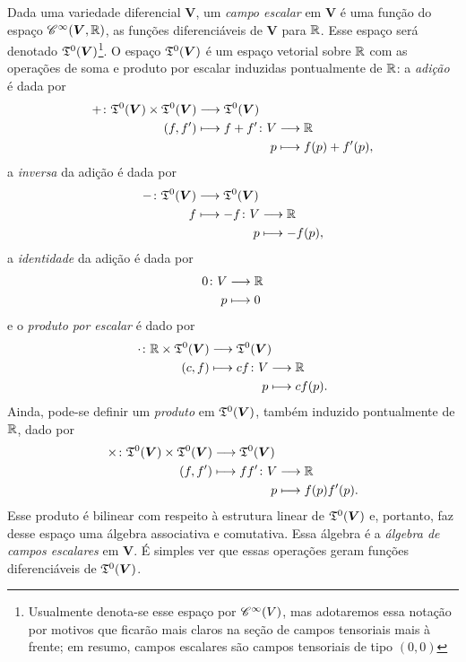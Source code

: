 Dada uma variedade diferencial $\bm V$, um \emph{campo escalar} em $\bm V$ é uma função do espaço $\mathscr{C}^\infty(\bm V,\mathbb{R})$, as funções diferenciáveis de $\bm V$ para $\mathbb{R}$. Esse espaço será denotado $\mathfrak{T}^0(\bm V)$\footnote{Usualmente denota-se esse espaço por $\mathscr{C}^\infty(V)$, mas adotaremos essa notação por motivos que ficarão mais claros na seção de campos tensoriais mais à frente; em resumo, campos escalares são campos tensoriais de tipo $(0,0)$}. O espaço $\mathfrak{T}^0(\bm V)$ é um espaço vetorial sobre $\mathbb{R}$ com as operações de soma e produto por escalar induzidas pontualmente de $\mathbb{R}$: a \emph{adição} é dada por
	\begin{align*}
	\func{+}{\tens^0(\bm V) \times \tens^0(\bm V)}{\tens^0(\bm V)}{(f,f')}{
		\begin{aligned}[t]
		\func{f+f'}{V}{\R}{p}{f(p)+f'(p)},
		\end{aligned}
		}
	\end{align*}
a \emph{inversa} da adição é dada por
	\begin{align*}
	\func{-}{\tens^0(\bm V)}{\tens^0(\bm V)}{f}{
		\begin{aligned}[t]
			\func{-f}{V}{\R}{p}{-f(p)},
		\end{aligned}
	}
	\end{align*}
a \emph{identidade} da adição é dada por
	\begin{align*}
	\func{0}{V}{\R}{p}{0}
	\end{align*}
e o \emph{produto por escalar} é dado por
	\begin{align*}
	\func{\cdot}{\R \times \tens^0(\bm V)}{\tens^0(\bm V)}{(c,f)}{
		\begin{aligned}[t]
		\func{cf}{V}{\R}{p}{cf(p).}
		\end{aligned}
		}
	\end{align*}
Ainda, pode-se definir um \emph{produto} em $\mathfrak{T}^0(\bm V)$, também induzido pontualmente de $\mathbb{R}$, dado por
	\begin{align*}
	\func{\times}{\tens^0(\bm V) \times \tens^0(\bm V)}{\tens^0(\bm V)}{(f,f')}{
		\begin{aligned}[t]
		\func{ff'}{V}{\R}{p}{f(p)f'(p).}
		\end{aligned}
		}
	\end{align*}
Esse produto é bilinear com respeito à estrutura linear de $\mathfrak{T}^0(\bm V)$ e, portanto, faz desse espaço uma álgebra associativa e comutativa. Essa álgebra é a \emph{álgebra de campos escalares} em $\bm V$. É simples ver que essas operações geram funções diferenciáveis de $\mathfrak{T}^0(\bm V)$.

